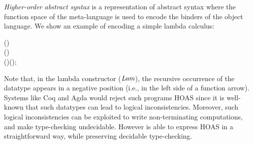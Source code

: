 \emph{Higher-order abstract syntax} is a representation of abstract
syntax where the function space of the meta-language is used to encode
the binders of the object language. We show an
example of encoding a simple lambda calculus:
\begin{hscode}\SaveRestoreHook
{}%
%
%
%
%
%
\>[3]{}\;\mathrel{=}\;(\mathbin{:}){}\<[E]%
\\
\>[3]{}\<[5]%
\>[5]{}\mid {}\<[5E]%
\>[8]{}\;(\mathbin{:}\to {}){}\<[E]%
\\
\>[3]{}\<[5]%
\>[5]{}\mid {}\<[5E]%
\>[8]{}\;(\mathbin{:})\;(\mathbin{:});{}\<[E]%
\ColumnHook
\end{hscode}\resethooks
Note that, in the lambda constructor (\ensuremath{\Conid{Lam}}), the recursive occurrence of the
datatype appears in a negative position (i.e., in the left side of a
function arrow).  Systems like Coq and Agda would reject such programs
HOAS since it is well-known that such datatypes can lead to logical
inconsistencies. Moreover, such logical inconsistencies can be
exploited to write non-terminating computations, and make type-checking
undecidable.
However \sufcc is able to express HOAS in a straightforward
way, while preserving decidable type-checking.

